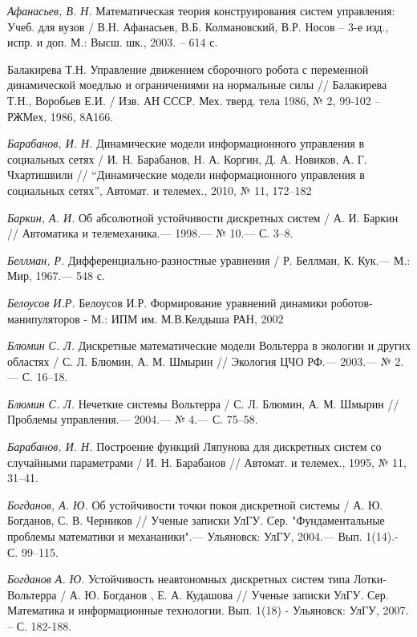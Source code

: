 \begin{thebibliography}{10}
	{\it Афанасьев, В. Н.} Математическая теория конструирования систем управления: Учеб. для вузов / В.Н. Афанасьев, В.Б. Колмановский, В.Р. Носов – 3-е изд., испр. и доп. М.: Высш. шк., 2003. – 614 с.

	Балакирева Т.Н. Управление движением сборочного робота с переменной динамической моедлью и ограничениями на нормальные силы // Балакирева Т.Н., Воробьев Е.И. / Изв. АН СССР. Мех. тверд. тела 1986, № 2, 99-102 – РЖМех, 1986, 8А166.

	{\it Барабанов, И. Н.} Динамические модели информационного управления в социальных сетях / И. Н. Барабанов, Н. А. Коргин, Д. А. Новиков, А. Г. Чхартишвили // “Динамические модели информационного управления в социальных сетях”, Автомат. и телемех., 2010, № 11, 172–182
	
	
	{\it Баркин, А. И.} Об абсолютной устойчивости дискретных систем / А. И. Баркин // Автоматика и телемеханика.— 1998.— № 10.— С. 3–8.
	
	{\it Беллман, Р.} Дифференциально-разностные уравнения / Р. Беллман, К. Кук.— М.: Мир,
	1967.— 548 с.
	
	{\it Белоусов И.Р.} Белоусов И.Р. Формирование уравнений динамики роботов-  манипуляторов - М.: ИПМ им. М.В.Келдыша РАН, 2002
	
	{\it Блюмин С. Л.} Дискретные математические модели Вольтерра в экологии и других областях /
	С. Л. Блюмин, А. М. Шмырин // Экология ЦЧО РФ.— 2003.— № 2.—
	С. 16–18.
	
	{\it Блюмин С. Л.} Нечеткие системы Вольтерра /
	С. Л. Блюмин, А. М. Шмырин // Проблемы управления.— 2004.— № 4.—
	С. 75–58.
	
	{\it Барабанов, И. Н.} Построение функций Ляпунова для дискретных систем со случайными параметрами / И. Н. Барабанов // Автомат. и телемех., 1995, № 11, 31–41.
	
	{\it Богданов, А. Ю.} Об устойчивости точки покоя дискретной системы / А. Ю. Богданов, С. В. Черников // Ученые записки УлГУ. Сер. "Фундаментальные проблемы математики и механаники".— Ульяновск: УлГУ, 2004.— Вып. 1(14).- С. 99–115.
	

	{\it Богданов А. Ю.} Устойчивость неавтономных дискретных систем типа Лотки-Вольтерра / А. Ю. Богданов , Е. А. Кудашова //
	Ученые записки УлГУ. Сер. Математика и информационные технологии. Вып. 1(18) - Ульяновск: УлГУ, 2007. – С. 182-188.
	

\end{thebibliography}
